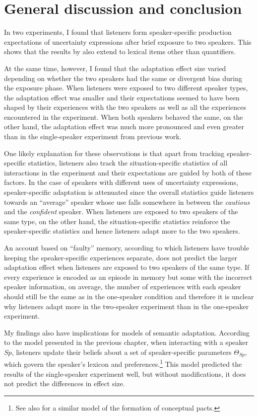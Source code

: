 \section{General discussion and conclusion}

In two experiments, I found that listeners form speaker-specific production expectations of 
uncertainty expressions after brief exposure to two speakers. This shows that the results
by \textcite{Yildirim2016} also extend to lexical items other than quantifiers. 

At the same time, however, I found that the adaptation effect size varied depending on 
whether the two speakers had the same or divergent bias during the exposure phase.
When listeners were exposed to two different speaker types, the adaptation effect was smaller
and their expectations seemed to have been shaped by their experiences with the two speakers as well as all the experiences encountered in the experiment.
When both speakers behaved the same, on the other hand, the adaptation effect was much 
more pronounced and even greater than in the single-speaker experiment from previous work.

One likely explanation for these observations is that apart from tracking speaker-specific statistics,
listeners also track the situation-specific statistics of all interactions in the experiment and their expectations
are guided by both of these factors. In the case of speakers with different uses of uncertainty expressions,
speaker-specific adaptation is attenuated since the overall statistics guide listeners towards an ``average''
speaker whose use falls somewhere in between the \textit{cautious} and the \textit{confident} speaker. When listeners
are exposed to two speakers of the same type, on the other hand, the situation-specific statistics reinforce
the speaker-specific statistics and hence listeners adapt more to the two speakers. 

An account based on ``faulty'' memory, according to which listeners have trouble keeping the 
speaker-specific experiences separate, does not predict the larger adaptation effect
when listeners are exposed to two speakers of the same type. If every experience
is encoded as an episode in memory but some with the incorrect speaker information, on average,
the number of experiences with each speaker should still be the same as in the one-speaker
condition and therefore it is unclear why listeners adapt more in the two-speaker experiment than
in the one-speaker experiment.

My findings also have implications for models of semantic adaptation. According to the model presented in the previous chapter, when interacting with a speaker 
$Sp$, listeners update their beliefs about a set of speaker-specific parameters $\Theta_{Sp}$, which govern the speaker's lexicon and preferences.\footnote{See 
also \textcite{Hawkins2017} for a similar model of the formation of conceptual pacts.} 
This model predicted the results of the single-speaker experiment well, but without modifications, it does not
predict the differences in effect size.


